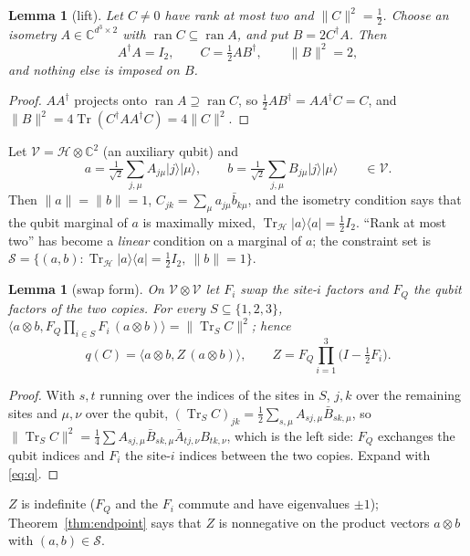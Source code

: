 \documentclass[aps,pra,twocolumn,superscriptaddress,nofootinbib,longbibliography]{revtex4-2}
\newcommand{\C}{\mathbb C}
\newcommand{\Hh}{\mathcal H}
\newcommand{\V}{\mathcal V}
\newcommand{\ip}[2]{\langle #1,#2\rangle}
\newcommand{\ket}[1]{|#1\rangle}
\newcommand{\bra}[1]{\langle #1|}
\DeclareMathOperator{\Tr}{Tr}
\DeclareMathOperator{\ran}{ran}
\theoremstyle{plain}
\newtheorem{lemma}[theorem]{Lemma}
\theoremstyle{definition}
\theoremstyle{remark}
\begin{document}
\begin{lemma}[lift]\label{lem:lift}
Let $C\ne0$ have rank at most two and $\|C\|^2=\tfrac12$. Choose an isometry $A\in\C^{d^3\times2}$ with $\ran C\subseteq\ran A$, and put $B=2C^\dagger A$. Then
\begin{equation}\label{eq:lift}
A^\dagger A=I_2,\qquad C=\tfrac12AB^\dagger,\qquad \|B\|^2=2 ,
\end{equation}
and nothing else is imposed on $B$.
\end{lemma}
\begin{proof}
$AA^\dagger$ projects onto $\ran A\supseteq\ran C$, so $\tfrac12AB^\dagger=AA^\dagger C=C$, and $\|B\|^2=4\Tr(C^\dagger AA^\dagger C)=4\|C\|^2$.
\end{proof}

Let $\V=\Hh\otimes\C^2$ (an auxiliary qubit) and
\begin{equation}\label{eq:ab}
a=\tfrac1{\sqrt2}\sum_{j,\mu}A_{j\mu}\ket j\ket\mu,\qquad b=\tfrac1{\sqrt2}\sum_{j,\mu}B_{j\mu}\ket j\ket\mu\qquad\in\V .
\end{equation}
Then $\|a\|=\|b\|=1$, $C_{jk}=\sum_\mu a_{j\mu}\bar b_{k\mu}$, and the isometry condition says that the qubit marginal of $a$ is maximally mixed, $\Tr_\Hh\ket a\bra a=\tfrac12I_2$. ``Rank at most two'' has become a \emph{linear} condition on a marginal of $a$; the constraint set is $\mathcal S=\{(a,b):\Tr_\Hh\ket a\bra a=\tfrac12I_2,\ \|b\|=1\}$.

\begin{lemma}[swap form]\label{lem:swap}
On $\V\otimes\V$ let $F_i$ swap the site-$i$ factors and $F_Q$ the qubit factors of the two copies. For every $S\subseteq\{1,2,3\}$,
$\ip{a\otimes b}{F_Q\prod_{i\in S}F_i\,(a\otimes b)}=\|\Tr_SC\|^2$; hence
\begin{equation}\label{eq:Z}
q(C)=\ip{a\otimes b}{Z\,(a\otimes b)},\qquad Z=F_Q\prod_{i=1}^3\bigl(I-\tfrac12F_i\bigr).
\end{equation}
\end{lemma}
\begin{proof}
With $s,t$ running over the indices of the sites in $S$, $j,k$ over the remaining sites and $\mu,\nu$ over the qubit, $(\Tr_SC)_{jk}=\tfrac12\sum_{s,\mu}A_{sj,\mu}\bar B_{sk,\mu}$, so $\|\Tr_SC\|^2=\tfrac14\sum A_{sj,\mu}\bar B_{sk,\mu}\bar A_{tj,\nu}B_{tk,\nu}$, which is the left side: $F_Q$ exchanges the qubit indices and $F_i$ the site-$i$ indices between the two copies. Expand with \eqref{eq:q}.
\end{proof}

$Z$ is indefinite ($F_Q$ and the $F_i$ commute and have eigenvalues $\pm1$); Theorem~\ref{thm:endpoint} says that $Z$ is nonnegative on the product vectors $a\otimes b$ with $(a,b)\in\mathcal S$.
\end{document}

